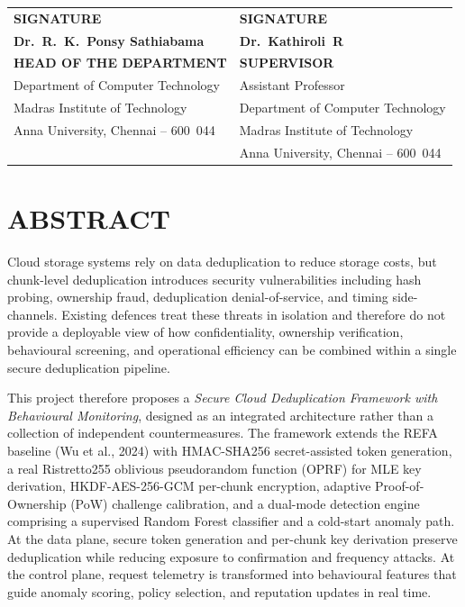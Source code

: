 \documentclass[12pt,a4paper,oneside]{report}
\begin{document}
\vspace{40pt}
\begin{tabular}{p{}p{}}
\textbf{SIGNATURE} & \textbf{SIGNATURE} \\[30pt]
\textbf{Dr.~R.~K.~Ponsy Sathiabama} & \textbf{Dr.~Kathiroli~R} \\
\textbf{HEAD OF THE DEPARTMENT} & \textbf{SUPERVISOR} \\
Department of Computer Technology & Assistant Professor \\
Madras Institute of Technology & Department of Computer Technology \\
Anna University, Chennai -- 600~044 & Madras Institute of Technology \\
& Anna University, Chennai -- 600~044
\end{tabular}

\chapter*{ABSTRACT}

Cloud storage systems rely on data deduplication to reduce storage costs, but chunk-level deduplication introduces security vulnerabilities including hash probing, ownership fraud, deduplication denial-of-service, and timing side-channels.
Existing defences treat these threats in isolation and therefore do not provide a deployable view of how confidentiality, ownership verification, behavioural screening, and operational efficiency can be combined within a single secure deduplication pipeline.

This project therefore proposes a \textit{Secure Cloud Deduplication Framework with Behavioural Monitoring}, designed as an integrated architecture rather than a collection of independent countermeasures.
The framework extends the REFA baseline (Wu et al., 2024) with HMAC-SHA256 secret-assisted token generation, a real Ristretto255 oblivious pseudorandom function (OPRF) for MLE key derivation, HKDF-AES-256-GCM per-chunk encryption, adaptive Proof-of-Ownership (PoW) challenge calibration, and a dual-mode detection engine comprising a supervised Random Forest classifier and a cold-start anomaly path.
At the data plane, secure token generation and per-chunk key derivation preserve deduplication while reducing exposure to confirmation and frequency attacks.
At the control plane, request telemetry is transformed into behavioural features that guide anomaly scoring, policy selection, and reputation updates in real time.
\end{document}

